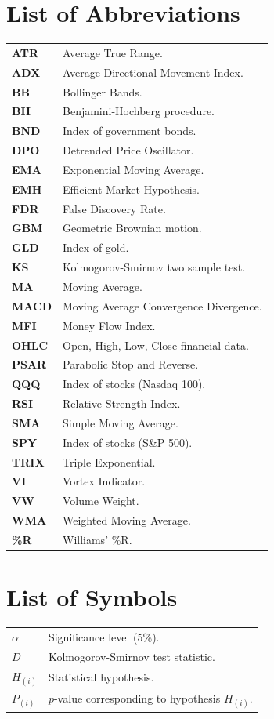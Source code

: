 \chapter{List of Abbreviations}
\begin{tabular}{ll}
  \textbf{ATR} & Average True Range.\\
  \textbf{ADX} & Average Directional Movement Index.\\
  \textbf{BB} & Bollinger Bands.\\
  \textbf{BH} & Benjamini-Hochberg procedure.\\
  \textbf{BND} & Index of government bonds.\\
  \textbf{DPO} & Detrended Price Oscillator.\\
  \textbf{EMA} & Exponential Moving Average.\\
  \textbf{EMH} & Efficient Market Hypothesis.\\
  \textbf{FDR} & False Discovery Rate.\\
  \textbf{GBM} & Geometric Brownian motion.\\
  \textbf{GLD} & Index of gold.\\
  \textbf{KS} & Kolmogorov-Smirnov two sample test.\\
  \textbf{MA} & Moving Average.\\
  \textbf{MACD} & Moving Average Convergence Divergence.\\
  \textbf{MFI} & Money Flow Index.\\
  \textbf{OHLC} & Open, High, Low, Close financial data.\\
  \textbf{PSAR} & Parabolic Stop and Reverse.\\
  \textbf{QQQ} & Index of stocks (Nasdaq 100).\\
  \textbf{RSI} & Relative Strength Index.\\
  \textbf{SMA} & Simple Moving Average.\\
  \textbf{SPY} & Index of stocks (S\&P 500).\\
  \textbf{TRIX} & Triple Exponential.\\
  \textbf{VI} & Vortex Indicator.\\
  \textbf{VW} & Volume Weight.\\
  \textbf{WMA} & Weighted Moving Average.\\
  \textbf{\%R} & Williams' \%R.\\
\end{tabular}
\newpage

\thispagestyle{empty}
\null
\newpage

\chapter{List of Symbols}
\begin{tabular}{ll}
  $\alpha$ & Significance level (5\%).\\
  $D$ & Kolmogorov-Smirnov test statistic.\\
  $H_{(i)}$ & Statistical hypothesis.\\
  $P_{(i)}$ & $p$-value corresponding to hypothesis $H_{(i)}$.\\
\end{tabular}
\newpage

\thispagestyle{empty}
\null
\newpage
